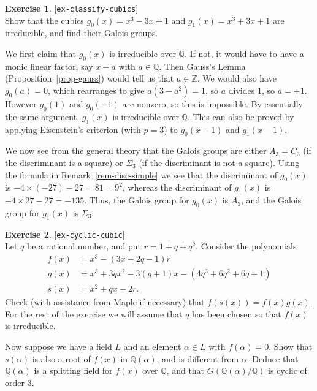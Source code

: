 \documentclass{amsart}
\newcommand{\Z}         {{\mathbb{Z}}}
\newcommand{\Q}         {{\mathbb{Q}}}
\newcommand{\al}        {\alpha}
\newcommand{\Sg}        {\Sigma}
\newcommand{\tm}        {\times}
\renewcommand{\:}{\colon}
\newcommand{\lastexlabel}{}
\newcommand{\exlabel}[1]{
 \global\def\lastexlabel{#1}\label{#1}[\texttt{#1}]\ \\
}
\newcommand{\exlabel}[1]{
 \global\def\lastexlabel{#1}\label{#1}
}
\newenvironment{solution}{\SolutionInline}{\endSolutionInline}
\theoremstyle{definition}
\newtheorem{exercise}{Exercise}[section]
\renewenvironment{solution}{\SolutionAtEnd}{\endSolutionAtEnd}
\begin{document}
\begin{exercise}\exlabel{ex-classify-cubics}
 Show that the cubics $g_0(x)=x^3-3x+1$ and $g_1(x)=x^3+3x+1$ are
 irreducible, and find their Galois groups.
\end{exercise}
\begin{solution}
 We first claim that $g_0(x)$ is irreducible over $\Q$.  If not, it
 would have to have a monic linear factor, say $x-a$ with $a\in\Q$.
 Then Gauss's Lemma (Proposition~\ref{prop-gauss}) would tell us that
 $a\in\Z$.  We would also have $g_0(a)=0$, which rearranges to give
 $a(3-a^2)=1$, so $a$ divides $1$, so $a=\pm 1$.  However $g_0(1)$ and
 $g_0(-1)$ are nonzero, so this is impossible.  By essentially the
 same argument, $g_1(x)$ is irreducible over $\Q$.  This can also be
 proved by applying Eisenstein's criterion (with $p=3$) to $g_0(x-1)$
 and $g_1(x-1)$.  

 We now see from the general theory that the Galois groups are either
 $A_3=C_3$ (if the discriminant is a square) or $\Sg_3$ (if the
 discriminant is not a square).  Using the formula in
 Remark~\ref{rem-disc-simple} we see that the discriminant of $g_0(x)$
 is $-4\tm(-27)-27=81=9^2$, whereas the discriminant of $g_1(x)$ is 
 $-4\tm 27-27=-135$.  Thus, the Galois group for $g_0(x)$ is $A_3$, and
 the Galois group for $g_1(x)$ is $\Sg_3$.
\end{solution}
\begin{exercise}\exlabel{ex-cyclic-cubic}
 Let $q$ be a rational number, and put $r=1+q+q^2$.  Consider the
 polynomials 
 \begin{align*}
  f(x) &= x^3 - (3x - 2q - 1)r \\
  g(x) &= x^3 + 3qx^2 - 3(q+1)x - (4q^3+6q^2+6q+1) \\
  s(x) &= x^2 +qx -2r.
 \end{align*}
 Check (with assistance from Maple if necessary) that
 $f(s(x))=f(x)g(x)$.  For the rest of the exercise we will assume that
 $q$ has been chosen so that $f(x)$ is irreducible.

 Now suppose we have a field $L$ and an element $\al\in L$ with
 $f(\al)=0$.  Show that $s(\al)$ is also a root of $f(x)$ in
 $\Q(\al)$, and is different from $\al$.  Deduce that $\Q(\al)$ is a
 splitting field for $f(x)$ over $\Q$, and that $G(\Q(\al)/\Q)$ is
 cyclic of order $3$.
\end{exercise}
\end{document}
